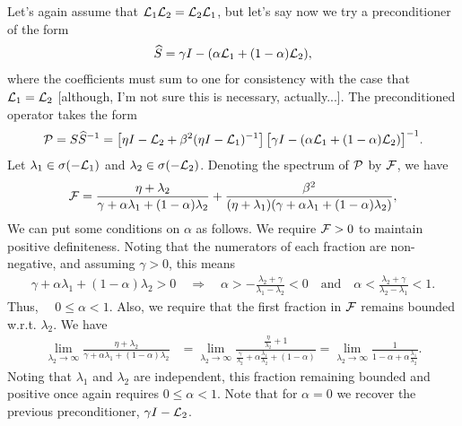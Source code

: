 \documentclass[a4paper,10pt]{article}
\begin{document}
{Let's again assume that ${\cal L}_1 {\cal L}_2 = {\cal L}_2 {\cal L}_1$, but let's say now we try a preconditioner of the form
\begin{align}
\widehat{S} = \gamma I - (\alpha {\cal L}_1 + (1 - \alpha) {\cal L}_2),
\end{align}
where the coefficients must sum to one for consistency with the case that ${\cal L}_1 = {\cal L}_2$ [although, I'm not sure this is necessary, actually...]. The preconditioned operator takes the form
\begin{align}
{\cal P}
= 
S \widehat{S}^{-1} 
= 
\left[ \eta I - {\cal L}_2 + \beta^2(\eta I - {\cal L}_1)^{-1} \right] 
\big[ \gamma I - (\alpha {\cal L}_1 + (1 - \alpha) {\cal L}_2) \big]^{-1}.
\end{align}
Let $\lambda_1 \in \sigma(- {\cal L}_1)$ and $\lambda_2 \in \sigma(- {\cal L}_2)$. Denoting the spectrum of ${\cal P}$ by ${\cal F}$, we have
\begin{align*}
{\cal F} 
&= \frac{\eta + \lambda_2}{\gamma + \alpha \lambda_1 + (1-\alpha) \lambda_2} + \frac{\beta^2}{(\eta + \lambda_1)(\gamma + \alpha \lambda_1 + (1-\alpha) \lambda_2)}, \\
\end{align*}
We can put some conditions on $\alpha$ as follows. We require ${\cal F} > 0$ to maintain positive definiteness. Noting that the numerators of each fraction are non-negative, and assuming $\gamma > 0$, this means
\begin{align*}
\gamma + \alpha \lambda_1 + (1 - \alpha) \lambda_2 > 0 
\quad \Longrightarrow \quad 
\alpha > - \frac{\lambda_2 + \gamma}{\lambda_1 - \lambda_2} < 0
\quad \textrm{and} \quad 
\alpha < \frac{\lambda_2 + \gamma}{\lambda_2 - \lambda_1} < 1.
\end{align*}
Thus, $\quad 0 \leq \alpha < 1$.
%
Also, we require that the first fraction in ${\cal F}$ remains bounded w.r.t. $\lambda_2$. We have
\begin{align*}
\lim \limits_{\lambda_2 \to \infty} \frac{\eta + \lambda_2}{\gamma + \alpha \lambda_1 + (1-\alpha) \lambda_2} 
&= 
\lim \limits_{\lambda_2 \to \infty} \frac{\tfrac{\eta}{\lambda_2} + 1}{\tfrac{\gamma}{\lambda_2} + \alpha \tfrac{\lambda_1}{\lambda_2} + (1-\alpha) } 
=
\lim \limits_{\lambda_2 \to \infty}
\frac{1}{1 - \alpha + \alpha \tfrac{\lambda_1}{\lambda_2}}.
\end{align*}
Noting that $\lambda_1$ and $\lambda_2$ are independent, this fraction remaining bounded and positive once again requires $0 \leq \alpha < 1$. Note that for $\alpha = 0$ we recover the previous preconditioner, $\gamma I - {\cal L}_2$.

}
\end{document}
